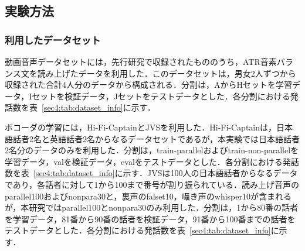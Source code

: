 \subsection{実験方法}
\subsubsection{利用したデータセット}
動画音声データセットには，先行研究\cite{taguchi,esaki}で収録されたもののうち，ATR音素バランス文\cite{atr}を読み上げたデータを利用した．このデータセットは，男女2人ずつから収録された合計4人分のデータから構成される．分割は，AからHセットを学習データ，Iセットを検証データ，Jセットをテストデータとした．各分割における発話数を表~\ref{sec4:tab:dataset_info}に示す．

ボコーダの学習には，Hi-Fi-Captain\cite{okamoto2023hi}とJVS\cite{takamichi2019jvs}を利用した．Hi-Fi-Captainは，日本語話者2名と英語話者2名からなるデータセットであるが，本実験では日本語話者2名分のデータのみを利用した．分割は，train-parallelおよびtrain-non-parallelを学習データ，valを検証データ，evalをテストデータとした．各分割における発話数を表~\ref{sec4:tab:dataset_info}に示す．JVSは100人の日本語話者からなるデータであり，各話者に対して1から100まで番号が割り振られている．読み上げ音声のparallel100およびnonpara30と，裏声のfalset10，囁き声のwhisper10が含まれるが，本研究ではparallel100とnonpara30のみ利用した．分割は，1から80番の話者を学習データ，81番から90番の話者を検証データ，91番から100番までの話者をテストデータとした．各分割における発話数を表~\ref{sec4:tab:dataset_info}に示す．

\begin{table*}[bt]
    \centering
    \caption{利用したデータセットの各分割における発話数}
    \label{sec4:tab:dataset_info}
    \begin{center}
        \renewcommand{\arraystretch}{0.9} %
        \setlength{\tabcolsep}{8pt}      %
    \end{center}
\end{table*}

